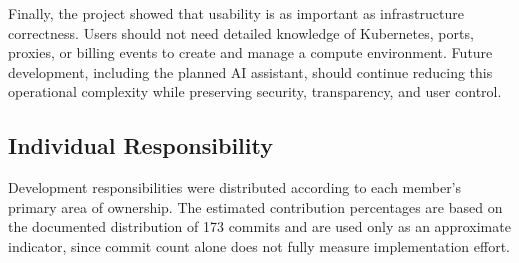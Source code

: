 \documentclass[12pt,a4paper]{article}
\begin{document}
Finally, the project showed that usability is as important as infrastructure correctness.
Users should not need detailed knowledge of Kubernetes, ports, proxies, or billing events
to create and manage a compute environment. Future development, including the planned
AI assistant, should continue reducing this operational complexity while preserving
security, transparency, and user control.

\subsection{Individual Responsibility}

Development responsibilities were distributed according to each member's primary
area of ownership. The estimated contribution percentages are based on the
documented distribution of 173 commits and are used only as an approximate
indicator, since commit count alone does not fully measure implementation effort.
\small
\renewcommand{\arraystretch}{1.25}
\setlength{\tabcolsep}{4pt}
\end{document}
